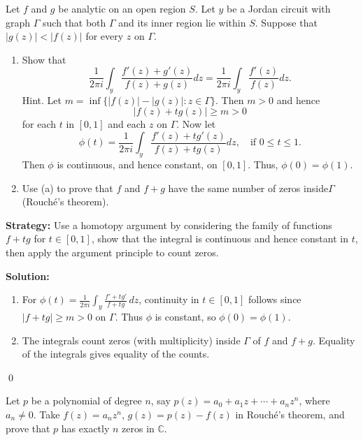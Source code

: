 \begin{problembox}
\begin{problemstatement}
Let \( f \) and \( g \) be analytic on an open region \( S \). Let \( y \) be a Jordan circuit with graph \( \Gamma \) such that both \( \Gamma \) and its inner region lie within \( S \). Suppose that \( |g(z)| < |f(z)| \) for every \( z \) on \( \Gamma \).
\begin{enumerate}[label=(\alph*)]
\item Show that
\[ \frac{1}{2\pi i} \int_{y} \frac{f'(z) + g'(z)}{f(z) + g(z)} dz = \frac{1}{2\pi i} \int_{y} \frac{f'(z)}{f(z)} dz. \]
Hint. Let \( m = \inf \{ |f(z)| - |g(z)| : z \in \Gamma \} \). Then \( m > 0 \) and hence
\[ |f(z) + t g(z)| \geq m > 0 \]
for each \( t \) in \( [0, 1] \) and each \( z \) on \( \Gamma \). Now let
\[ \phi(t) = \frac{1}{2\pi i} \int_{y} \frac{f'(z) + t g'(z)}{f(z) + t g(z)} dz, \quad \text{if } 0 \leq t \leq 1. \]
Then \( \phi \) is continuous, and hence constant, on \( [0, 1] \). Thus, \( \phi(0) = \phi(1) \).
\item Use (a) to prove that \( f \) and \( f + g \) have the same number of zeros inside\(\Gamma\) (Rouché's theorem).
\end{enumerate}
\end{problemstatement}
\end{problembox}

\noindent\textbf{Strategy:} Use a homotopy argument by considering the family of functions \( f + t g \) for \( t \in [0,1] \), show that the integral is continuous and hence constant in \( t \), then apply the argument principle to count zeros.

\bigskip\noindent\textbf{Solution:}
\begin{enumerate}[label=(\alph*)]
\item For $\phi(t)=\frac{1}{2\pi i}\int_{y}\frac{f'+t g'}{f+tg}\,dz$, continuity in $t\in[0,1]$ follows since $|f+tg|\ge m>0$ on $\Gamma$. Thus $\phi$ is constant, so $\phi(0)=\phi(1)$.
\item The integrals count zeros (with multiplicity) inside $\Gamma$ of $f$ and $f+g$. Equality of the integrals gives equality of the counts.
\end{enumerate}\qed


\begin{problembox}
\begin{problemstatement}
Let \( p \) be a polynomial of degree \( n \), say \( p(z) = a_0 + a_1 z + \cdots + a_n z^n \), where \( a_n \neq 0 \). Take \( f(z) = a_n z^n \), \( g(z) = p(z) - f(z) \) in Rouché's theorem, and prove that \( p \) has exactly \( n \) zeros in \( \mathbb{C} \).
\end{problemstatement}
\end{problembox}

